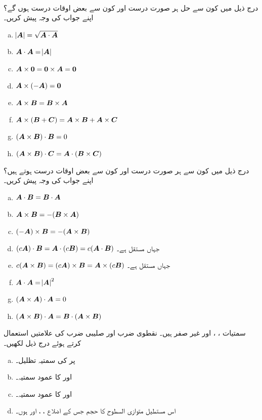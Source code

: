 \\
درج ذیل میں کون سے حل ہر صورت درست اور کون سے بعض اوقات درست ہوں گے؟ اپنے جواب کی وجہ پیش کریں۔
\begin{enumerate}[a.]
\item
$\abs{\kvec{A}}=\sqrt{\kvec{A}\cdot\kvec{A}}$
\item
$\kvec{A}\cdot\kvec{A}=\abs{\kvec{A}}$
\item
$\kvec{A}\times \kvec{0}=\kvec{0}\times\kvec{A}=\kvec{0}$
\item
$\kvec{A}\times (-\kvec{A})=\kvec{0}$
\item
$\kvec{A}\times\kvec{B}=\kvec{B}\times\kvec{A}$
\item
$\kvec{A}\times(\kvec{B}+\kvec{C})=\kvec{A}\times\kvec{B}+\kvec{A}\times\kvec{C}$
\item
$(\kvec{A}\times\kvec{B})\cdot\kvec{B}=0$
\item
$(\kvec{A}\times\kvec{B})\cdot\kvec{C}=\kvec{A}\cdot(\kvec{B}\times\kvec{C})$
\end{enumerate}
درج ذیل میں کون سے ہر صورت درست اور کون سے بعض اوقات درست ہوتے ہیں؟ اپنے جواب کی وجہ پیش کریں۔
\begin{enumerate}[a.]
\item
$\kvec{A}\cdot\kvec{B}=\kvec{B}\cdot\kvec{A}$
\item
$\kvec{A}\times\kvec{B}=-(\kvec{B}\times\kvec{A})$
\item
$(-\kvec{A})\times\kvec{B}=-(\kvec{A}\times\kvec{B})$
\item
$(c\kvec{A})\cdot\kvec{B}=\kvec{A}\cdot(c\kvec{B})=c(\kvec{A}\cdot\kvec{B})$
\quad
جہاں  مستقل ہے۔
\item
$c(\kvec{A}\times\kvec{B})=(c\kvec{A})\times\kvec{B}=\kvec{A}\times(c\kvec{B})$
\quad
جہاں  مستقل ہے۔
\item
$\kvec{A}\cdot\kvec{A}=\abs{\kvec{A}}^2$
\item
$(\kvec{A}\times\kvec{A})\cdot\kvec{A}=0$
\item
$(\kvec{A}\times\kvec{B})\cdot\kvec{A}=\kvec{B}\cdot(\kvec{A}\times\kvec{B})$
\end{enumerate}
سمتیات ،  ، اور  غیر صفر ہیں۔ نقطوی ضرب اور صلیبی ضرب کی علامتیں استعمال کرتے ہوئے درج ذیل لکھیں۔
\begin{enumerate}[a.]
\item
{} پر  کی سمتیہ تظلیل۔
\item
{} اور  کا  عمود سمتیہ۔
\item
{} اور  کا عمود سمتیہ۔
\item
اس مستطیل متوازی السطوح کا حجم جس کے اضلاع ،  ، اور  ہوں۔
\end{enumerate}
